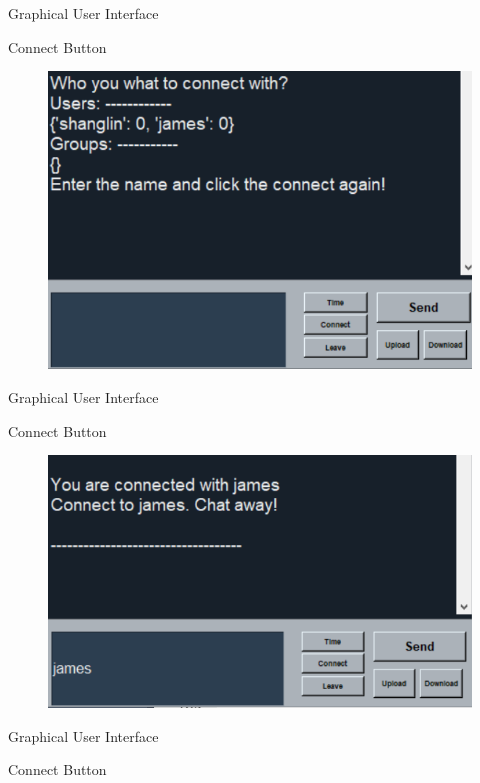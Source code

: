 \documentclass[a4paper,10pt]{beamer}
\begin{document}
\begin{frame}{Graphical User Interface}
\begin{block}{Connect Button}
\begin{figure}
    \centering
    \includegraphics[width=0.7\linewidth]{connect1.png}
\end{figure}
\end{block}
\end{frame}

\begin{frame}{Graphical User Interface}
\begin{block}{Connect Button}
\begin{figure}
    \centering
    \includegraphics[width=0.7\linewidth]{connect2.png}
\end{figure}
\end{block}
\end{frame}

\begin{frame}{Graphical User Interface}
\begin{block}{Connect Button}
\inputminted[linenos]{python}{connect.py}
\end{block}
\end{frame}
\end{document}
